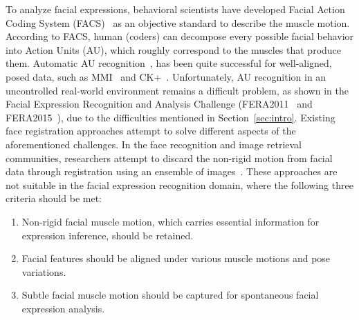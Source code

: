 \documentclass[10pt,journal]{IEEEtran}
\begin{document}
To analyze facial expressions, behavioral scientists have developed Facial Action Coding System (FACS)~\cite{Ekman78} as an objective standard to describe the muscle motion. According to FACS, human (coders) can decompose every possible facial behavior into Action Units (AU), which roughly correspond to the muscles that produce them. Automatic AU recognition~\cite{Zhao_PAMI07}\cite{Valstar_SMCB12}, has been quite successful for well-aligned, posed data, such as MMI~\cite{Pantic_ICME05} and CK+~\cite{Kanade_FG00}. Unfortunately, AU recognition in an uncontrolled real-world environment remains a difficult problem, as shown in the Facial Expression Recognition and Analysis Challenge (FERA2011~\cite{Valstar_FERA11} and FERA2015~\cite{FERA15}), due to the difficulties mentioned in Section~\ref{sec:intro}. Existing face registration approaches attempt to solve different aspects of the aforementioned challenges. In the face recognition and image retrieval communities, researchers attempt to discard the non-rigid motion from facial data through registration using an ensemble of images~\cite{LearnedMiller_PAMI06}\cite{Huang_ICCV07}\cite{Peng_PAMI12}. These approaches are not suitable in the facial expression recognition domain, where the following three criteria should be met:
\begin{enumerate}
\item Non-rigid facial muscle motion, which carries essential information for expression inference, should be retained. 
\item Facial features should be aligned under various muscle motions and pose variations. 
\item Subtle facial muscle motion should be captured for spontaneous facial expression analysis.
\end{enumerate}
\end{document}

